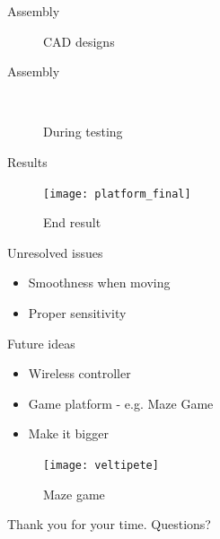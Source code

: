 \documentclass{rubeamer}
\begin{document}
\begin{frame}{Assembly}
	\begin{figure}
		\centering
		\caption*{CAD designs}
	\end{figure}
\end{frame}

\begin{frame}{Assembly}
	\begin{figure}
		\centering
		~
		\caption*{During testing}
	\end{figure}
\end{frame}

\begin{frame}{Results}
	\begin{figure}
		\centering
		\texttt{[image: platform\_final]}
		\caption*{End result}
	\end{figure}
\end{frame}

\begin{frame}{Unresolved issues}
	\begin{itemize}
		\item Smoothness when moving
		\item Proper sensitivity
	\end{itemize}
\end{frame}

\begin{frame}{Future ideas}
	\vspace{3em}
	\begin{itemize}
		\item Wireless controller
		\item Game platform - e.g. Maze Game
		\item Make it bigger
	\end{itemize}
	
	\begin{figure}
		\vspace{-3em}
		\centering
		\texttt{[image: veltipete]}
		\caption*{Maze game~\cite{veltipete}}
	\end{figure}
\end{frame}
\begin{frame}
	\centering
	Thank you for your time.
	Questions?\\
\end{frame}

\bibframe
\end{document}
